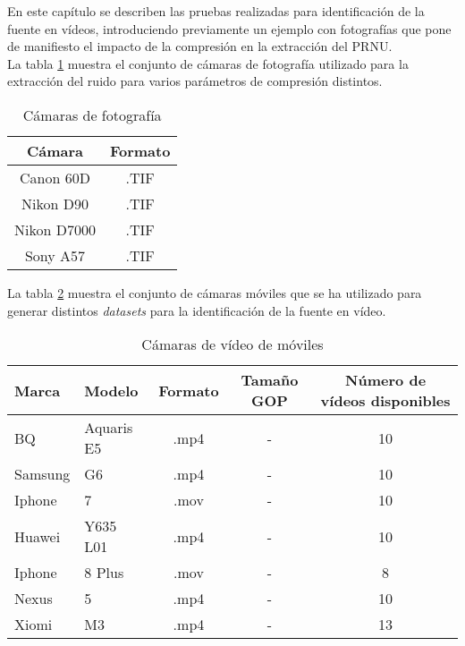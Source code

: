 En este capítulo se describen las pruebas realizadas para identificación de la fuente en vídeos, introduciendo previamente un ejemplo con fotografías que pone de manifiesto el impacto de la compresión en la extracción del PRNU. \\

La tabla \ref{tabla:fotos} muestra el conjunto de cámaras de fotografía utilizado para la extracción del ruido para varios parámetros de compresión distintos. \\

\begin{table}[!htb]
    \centering
        \begin{tabular}{|c|c|}
        \hline
        \rowcolor[gray]{0.9}\textbf{Cámara} & \textbf{Formato} \\ 
        \hline
        Canon 60D & .TIF \\ 
        \hline
        Nikon D90 & .TIF \\ 
        \hline
        Nikon D7000 & .TIF \\ 
        \hline
        Sony A57 & .TIF \\ 
        \hline
        \end{tabular}
    \caption{Cámaras de fotografía}
    \label{tabla:fotos}
\end{table}

La tabla \ref{tabla:videos} muestra el conjunto de cámaras móviles que se ha utilizado para generar distintos \textit{datasets} para la identificación de la fuente en vídeo. \\

\begin{table}[!htb]
    \centering
        \begin{tabular}{|l|l|c|c|c|}
        \hline
        \rowcolor[gray]{0.9}
        \textbf{Marca} & \textbf{Modelo} & \textbf{Formato} & \textbf{Tama\~no GOP} & \textbf{Número de vídeos disponibles} \\ \hline
        BQ & Aquaris E5 & .mp4 & - & 10 \\ \hline
        Samsung & G6 & .mp4 & - & 10 \\ \hline
        Iphone & 7 & .mov & - & 10 \\ \hline
        Huawei & Y635 L01 & .mp4 & - & 10 \\ \hline
        Iphone & 8 Plus & .mov & - & 8 \\ \hline
        Nexus & 5 & .mp4 & - & 10 \\ \hline
        Xiomi & M3 & .mp4 & - & 13 \\ \hline
        \end{tabular}
    \caption{Cámaras de vídeo de móviles}
    \label{tabla:videos}
\end{table}

